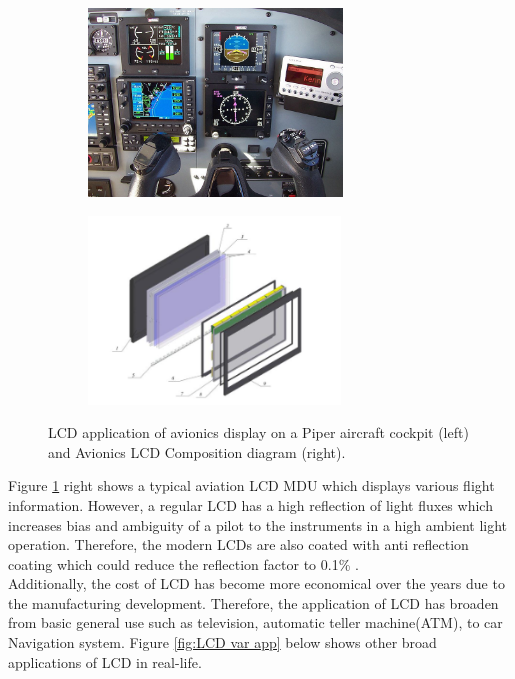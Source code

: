 \begin{figure}[!ht]
\begin{center}
%    
  \begin{subfigure}[b]{0.4\textwidth}
    \includegraphics[height=5cm]{Figures/LCD_Avionics_5inch.jpg}
  \end{subfigure}
  \begin{subfigure}[b]{0.35\textwidth}
    \includegraphics[height=5cm]{Figures/LCD_avionics_composition.PNG}
  \end{subfigure}
%  
  \caption{LCD application of avionics display on a Piper aircraft cockpit \cite{Anonymous5LCD} (left) and Avionics LCD Composition diagram \cite{Alimova2020MethodsApplications} (right).}
    \label{fig:avionics 5inc}
\end{center}
\end{figure}

\noindent Figure \ref{fig:avionics 5inc} right shows a typical aviation LCD MDU which displays various flight information. However, a regular LCD has a high reflection of light fluxes which increases bias and ambiguity of a pilot to the instruments in a high ambient light operation. Therefore, the modern LCDs are also coated with anti reflection coating which could reduce the reflection factor to 0.1\% \cite{Livada2012AFVCriteria}.\\

\noindent Additionally, the cost of LCD has become more economical over the years due to the manufacturing development. Therefore, the application of LCD has broaden from basic general use such as television, automatic teller machine(ATM), to car Navigation system. Figure \ref{fig:LCD var app} below shows other broad applications of LCD in real-life.\\

